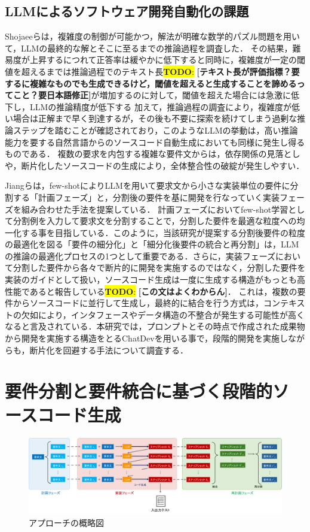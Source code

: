 \documentclass[submit,techrep,noauthor]{ipsj}
\newcommand{\todo}[1]{\colorbox{yellow}{{\bf TODO}:}{\color{red} {\textbf{[#1]}}}}
\begin{document}
\subsection{LLMによるソフトウェア開発自動化の課題}
Shojaeeら\cite{IllusionApple}は，複雑度の制御が可能かつ，解法が明確な数学的パズル問題を用いて，LLMの最終的な解とそこに至るまでの推論過程を調査した．
その結果，難易度が上昇するにつれて正答率は緩やかに低下すると同時に，複雑度が一定の閾値を超えるまでは推論過程でのテキスト長\todo{テキスト長が評価指標？要するに複雑なものでも生成できるけど，閾値を超えると生成することを諦めるってこと？要日本語修正}が増加するのに対して，閾値を超えた場合には急激に低下し，LLMの推論精度が低下する
加えて，推論過程の調査により，複雑度が低い場合は正解まで早く到達するが，その後も不要に探索を続けてしまう過剰な推論ステップを踏むことが確認されており，このようなLLMの挙動は，高い推論能力を要する自然言語からのソースコード自動生成においても同様に発生し得るものである．
複数の要求を内包する複雑な要件文からは，依存関係の見落としや，断片化したソースコードの生成により，全体整合性の破綻が発生しやすい．

Jiangら\cite{tosem}は，few-shotによりLLMを用いて要求文から小さな実装単位の要件に分割する「計画フェーズ」と，分割後の要件を基に開発を行なっていく実装フェーズを組み合わせた手法を提案している．
計画フェーズにおいてfew-shot学習として分割例を入力して要求文を分割することで，分割した要件を最適な粒度への均一化する事を目指している．このように，当該研究が提案する分割後要件の粒度の最適化を図る「要件の細分化」と「細分化後要件の統合と再分割」は，LLMの推論の最適化プロセスの1つとして重要である．さらに，実装フェーズにおいて分割した要件から各々で断片的に開発を実施するのではなく，分割した要件を実装のガイドとして扱い，ソースコード生成は一度に生成する構造がもっとも高性能であると報告している\todo{この文はよくわからん}．
これは，複数の要件からソースコードに並行して生成し，最終的に結合を行う方式は，コンテキストの欠如により，インタフェースやデータ構造の不整合が発生する可能性が高くなると言及されている．本研究では，プロンプトとその時点で作成された成果物から開発を実施する構造をとるChatDevを用いる事で，段階的開発を実施しながらも，断片化を回避する手法について調査する．


\section{要件分割と要件統合に基づく段階的ソースコード生成}
\label{sec:method}

\begin{figure}[t]
    \centering
    \includegraphics[width=1.0\linewidth]{./Toyoshima_fig/approach_abst_v3.pdf}
    \caption{アプローチの概略図}
    \label{approach_abst}
\end{figure}
\end{document}
